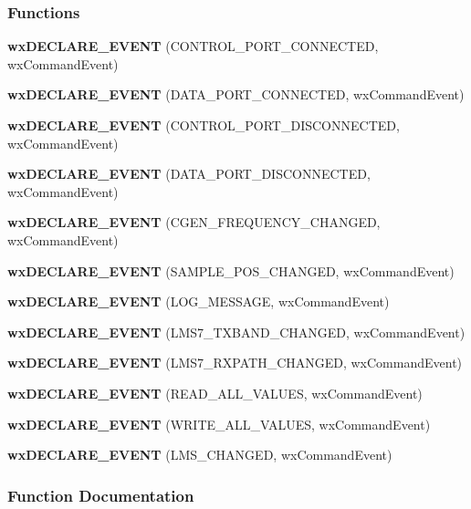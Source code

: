 \subsubsection*{Functions}
\begin{DoxyCompactItemize}
\item 
{\bf wx\+D\+E\+C\+L\+A\+R\+E\+\_\+\+E\+V\+E\+NT} (C\+O\+N\+T\+R\+O\+L\+\_\+\+P\+O\+R\+T\+\_\+\+C\+O\+N\+N\+E\+C\+T\+ED, wx\+Command\+Event)
\item 
{\bf wx\+D\+E\+C\+L\+A\+R\+E\+\_\+\+E\+V\+E\+NT} (D\+A\+T\+A\+\_\+\+P\+O\+R\+T\+\_\+\+C\+O\+N\+N\+E\+C\+T\+ED, wx\+Command\+Event)
\item 
{\bf wx\+D\+E\+C\+L\+A\+R\+E\+\_\+\+E\+V\+E\+NT} (C\+O\+N\+T\+R\+O\+L\+\_\+\+P\+O\+R\+T\+\_\+\+D\+I\+S\+C\+O\+N\+N\+E\+C\+T\+ED, wx\+Command\+Event)
\item 
{\bf wx\+D\+E\+C\+L\+A\+R\+E\+\_\+\+E\+V\+E\+NT} (D\+A\+T\+A\+\_\+\+P\+O\+R\+T\+\_\+\+D\+I\+S\+C\+O\+N\+N\+E\+C\+T\+ED, wx\+Command\+Event)
\item 
{\bf wx\+D\+E\+C\+L\+A\+R\+E\+\_\+\+E\+V\+E\+NT} (C\+G\+E\+N\+\_\+\+F\+R\+E\+Q\+U\+E\+N\+C\+Y\+\_\+\+C\+H\+A\+N\+G\+ED, wx\+Command\+Event)
\item 
{\bf wx\+D\+E\+C\+L\+A\+R\+E\+\_\+\+E\+V\+E\+NT} (S\+A\+M\+P\+L\+E\+\_\+\+P\+O\+S\+\_\+\+C\+H\+A\+N\+G\+ED, wx\+Command\+Event)
\item 
{\bf wx\+D\+E\+C\+L\+A\+R\+E\+\_\+\+E\+V\+E\+NT} (L\+O\+G\+\_\+\+M\+E\+S\+S\+A\+GE, wx\+Command\+Event)
\item 
{\bf wx\+D\+E\+C\+L\+A\+R\+E\+\_\+\+E\+V\+E\+NT} (L\+M\+S7\+\_\+\+T\+X\+B\+A\+N\+D\+\_\+\+C\+H\+A\+N\+G\+ED, wx\+Command\+Event)
\item 
{\bf wx\+D\+E\+C\+L\+A\+R\+E\+\_\+\+E\+V\+E\+NT} (L\+M\+S7\+\_\+\+R\+X\+P\+A\+T\+H\+\_\+\+C\+H\+A\+N\+G\+ED, wx\+Command\+Event)
\item 
{\bf wx\+D\+E\+C\+L\+A\+R\+E\+\_\+\+E\+V\+E\+NT} (R\+E\+A\+D\+\_\+\+A\+L\+L\+\_\+\+V\+A\+L\+U\+ES, wx\+Command\+Event)
\item 
{\bf wx\+D\+E\+C\+L\+A\+R\+E\+\_\+\+E\+V\+E\+NT} (W\+R\+I\+T\+E\+\_\+\+A\+L\+L\+\_\+\+V\+A\+L\+U\+ES, wx\+Command\+Event)
\item 
{\bf wx\+D\+E\+C\+L\+A\+R\+E\+\_\+\+E\+V\+E\+NT} (L\+M\+S\+\_\+\+C\+H\+A\+N\+G\+ED, wx\+Command\+Event)
\end{DoxyCompactItemize}


\subsubsection{Function Documentation}
